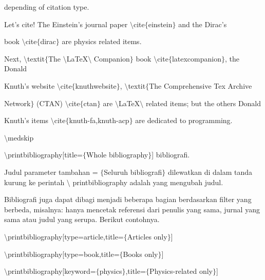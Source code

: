 \begin{itemize}
depending of citation type. \par
\vspace{\baselineskip}
Let's cite! The Einstein's journal paper $\setminus$cite$ \{ $einstein$ \} $ and the Dirac's \par

book $\setminus$cite$ \{ $dirac$ \} $ are physics related items. \par

Next, $\setminus$textit$ \{ $The $\setminus$LaTeX$\setminus$ Companion$ \} $ book $\setminus$cite$ \{ $latexcompanion$ \} $, the Donald \par
\vspace{\baselineskip}
Knuth's website $\setminus$cite$ \{ $knuthwebsite$ \} $, $\setminus$textit$ \{ $The Comprehensive Tex Archive \par

Network$ \} $ (CTAN) $\setminus$cite$ \{ $ctan$ \} $ are $\setminus$LaTeX$\setminus$ related items; but the others Donald \par

Knuth's items $\setminus$cite$ \{ $knuth-fa,knuth-acp$ \} $ are dedicated to programming. \par

$\setminus$medskip \par

$\setminus$printbibliography[title=$ \{ $Whole bibliography$ \} $] bibliografi.\par
\vspace{\baselineskip}
Judul parameter tambahan = $ \{ $Seluruh bibliografi$ \} $ dilewatkan di dalam tanda kurung ke perintah $\setminus$ printbibliography adalah yang mengubah judul.\par

Bibliografi juga dapat dibagi menjadi beberapa bagian berdasarkan filter yang berbeda, misalnya: hanya mencetak referensi dari penulis yang sama, jurnal yang sama atau judul yang serupa. Berikut contohnya.\par

$\setminus$printbibliography[type=article,title=$ \{ $Articles only$ \} $]\par

$\setminus$printbibliography[type=book,title=$ \{ $Books only$ \} $]\par

 \par

$\setminus$printbibliography[keyword=$ \{ $physics$ \} $,title=$ \{ $Physics-related only$ \} $]\par


\end{itemize}

